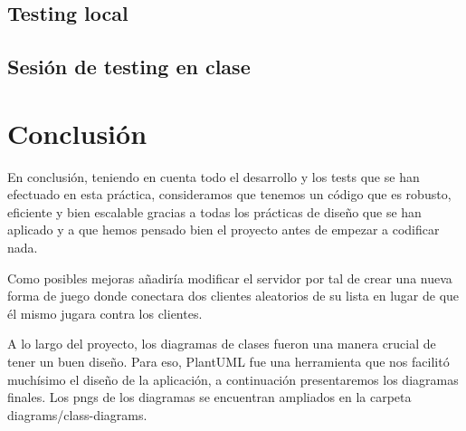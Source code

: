 \subsection*{Testing local}

\newpage
\subsection*{Sesión de testing en clase}


\newpage
\section*{Conclusión}
En conclusión, teniendo en cuenta todo el desarrollo y los tests que se han efectuado en esta práctica, consideramos que tenemos un código que es robusto, eficiente y bien escalable gracias a todas los prácticas de diseño que se han aplicado y a que hemos pensado bien el proyecto antes de empezar a codificar nada.

Como posibles mejoras añadiría modificar el servidor por tal de crear una nueva forma de juego donde conectara dos clientes aleatorios de su lista en lugar de que él mismo jugara contra los clientes.

A lo largo del proyecto, los diagramas de clases fueron una manera crucial de tener un buen diseño. Para eso, PlantUML fue una herramienta que nos facilitó muchísimo el diseño de la aplicación, a continuación presentaremos los diagramas finales. Los pngs de los diagramas se encuentran ampliados en la carpeta diagrams/class-diagrams.

\newpage
